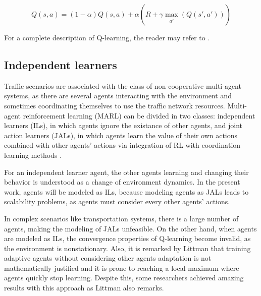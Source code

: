 \documentclass{RITA}
\begin{document}
\begin{equation}
\label{eq:qlearning}
Q(s,a) = (1 - \alpha) Q(s,a) + \alpha (R + \gamma \max_{\substack{a'}}(Q(s',a')))
\end{equation}

For a complete description of Q-learning, the reader may refer to \cite{Watkins&Dayan1992}.



\subsection{Independent learners} 
Traffic scenarios are associated with the class of non-cooperative multi-agent systems, as there are several agents interacting with the environment and sometimes coordinating themselves to use the traffic network resources. Multi-agent reinforcement learning (MARL) can be divided in two classes: independent learners (ILs), in which agents ignore the existance of other agents, and joint action learners (JALs), in which agents learn the value of their own actions combined with other agents' actions via integration of RL with coordination learning methods \cite{Claus&Boutilier1998}. 

For an independent learner agent, the other agents learning and changing their behavior is understood as a change of environment dynamics. In the present work, agents will be modeled as ILs, because modeling agents as JALs leads to scalability problems, as agents must consider every other agents' actions. 

In complex scenarios like transportation systems, there is a large number of agents, making the modeling of JALs unfeasible. On the other hand, when agents are modeled as ILs, the convergence properties of Q-learning become invalid, as the environment is nonstationary. Also, it is remarked by Littman \cite{Littman1994} that training adaptive agents without considering other agents adaptation is not mathematically justified and it is prone to reaching a local maximum where agents quickly stop learning. Despite this, some researchers achieved amazing results with this approach as Littman \cite{Littman1994} also remarks.
\end{document}
